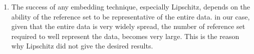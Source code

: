 \begin{enumerate}
\item  {The success of any embedding technique, especially Lipschitz, depends on the ability of the reference set to be representative of the entire data. in our case, given that the entire data is very widely spread, the number of reference set required to well represent the data, becomes very large. This is the reason why Lipschitz did not give the desired results.}
\end{enumerate}
